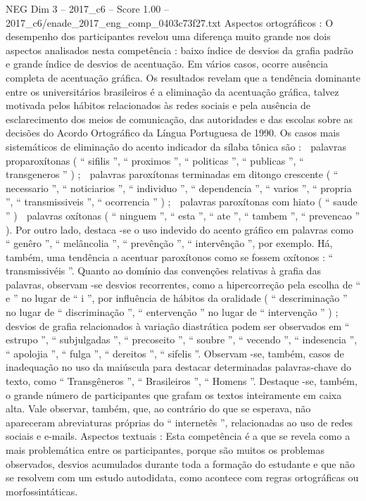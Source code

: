 \begin{textsample}{NEG Dim 3 – 2017\_c6 – Score 1.00 – 2017\_c6/enade\_2017\_eng\_comp\_0403c73f27.txt}
Aspectos ortográficos : O desempenho dos participantes revelou uma diferença muito grande nos dois aspectos analisados nesta competência : baixo índice de desvios da grafia padrão e grande índice de desvios de acentuação.
Em vários casos, ocorre ausência completa de acentuação gráfica.
Os resultados revelam que a tendência dominante entre os universitários brasileiros é a eliminação da acentuação gráfica, talvez motivada pelos hábitos relacionados às redes sociais e pela ausência de esclarecimento dos meios de comunicação, das autoridades e das escolas sobre as decisões do Acordo Ortográfico da Língua Portuguesa de 1990.
Os casos mais sistemáticos de eliminação do acento indicador da sílaba tônica são :  palavras proparoxítonas ( “ sifilis ”, “ proximos ”, “ politicas ”, “ publicas ”, “ transgeneros ” ) ;  palavras paroxítonas terminadas em ditongo crescente ( “ necessario ”, “ noticiarios ”, “ individuo ”, “ dependencia ”, “ varios ”, “ propria ”, “ transmissiveis ”, “ ocorrencia ” ) ;  palavras paroxítonas com hiato ( “ saude ” )  palavras oxítonas ( “ ninguem ”, “ esta ”, “ ate ”, “ tambem ”, “ prevencao ” ).
Por outro lado, destaca -se o uso indevido do acento gráfico em palavras como “ genêro ”, “ melâncolia ”, “ prevênção ”, “ intervênção ”, por exemplo.
Há, também, uma tendência a acentuar paroxítonos como se fossem oxítonos : “ transmissivéis ”.
Quanto ao domínio das convenções relativas à grafia das palavras, observam -se desvios recorrentes, como a hipercorreção pela escolha de “ e ” no lugar de “ i ”, por influência de hábitos da oralidade ( “ descriminação ” no lugar de “ discriminação ”, “ entervenção ” no lugar de “ intervenção ” ) ; desvios de grafia relacionados à variação diastrática podem ser observados em “ estrupo ”, “ subjulgadas ”, “ precoseito ”, “ soubre ”, “ vecendo ”, “ indesencia ”, “ apolojia ”, “ fulga ”, “ dereitos ”, “ sifelis ”.
Observam -se, também, casos de inadequação no uso da maiúscula para destacar determinadas palavras-chave do texto, como “ Transgêneros ”, “ Brasileiros ”, “ Homens ”.
Destaque -se, também, o grande número de participantes que grafam os textos inteiramente em caixa alta.
Vale observar, também, que, ao contrário do que se esperava, não apareceram abreviaturas próprias do “ internetês ”, relacionadas ao uso de redes sociais e e-mails.
Aspectos textuais : Esta competência é a que se revela como a mais problemática entre os participantes, porque são muitos os problemas observados, desvios acumulados durante toda a formação do estudante e que não se resolvem com um estudo autodidata, como acontece com regras ortográficas ou morfossintáticas.

\end{textsample}
